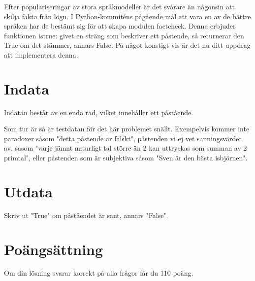 \noindent
Efter populariseringar av stora språkmodeller är det svårare än någonsin att skilja
fakta från lögn. I Python-kommiténs pågående mål att vara en av de bättre språken har
de bestämt sig för att skapa modulen factcheck. Denna erbjuder funktionen istrue:
givet en sträng som beskriver ett påstende, så returnerar den True om det stämmer,
annars False. På något konstigt vis är det nu ditt uppdrag att implementera denna.


\section*{Indata}
\noindent
Indatan består av en enda rad, vilket innehåller ett påstående.

Som tur är så är testdatan för det här problemet snällt. Exempelvis kommer inte paradoxer
såsom "detta påstende är falskt", påstenden vi ej vet sanningsvärdet av, såsom "varje
jämnt naturligt tal större än 2 kan uttryckas som summan av 2 primtal", eller påstenden
som är subjektiva såsom "Sven är den bästa isbjörnen".

\section*{Utdata}
\noindent
Skriv ut "True" om påståendet är sant, annars "False".

\section*{Poängsättning}
Om din lösning svarar korrekt på alla frågor får du 110 poäng.
